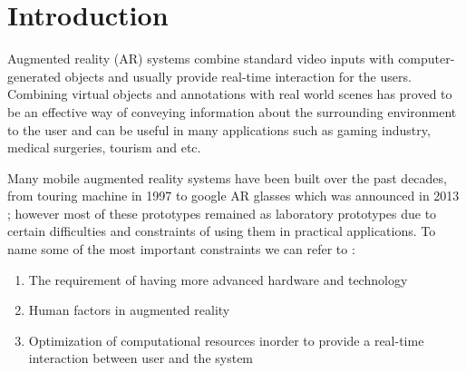 \documentclass[dvips,letterpaper,12pt]{report}
\begin{document}
\chapter{Introduction}

Augmented reality (AR) systems combine standard video inputs with computer-generated objects and
usually provide real-time interaction for the users. Combining virtual objects and annotations with real
world scenes has proved to be an effective way of conveying information about the surrounding environment to
the user and can be useful in many applications such as gaming industry, medical surgeries, tourism and etc.

Many mobile augmented reality systems have been built over the past decades, from touring machine in 1997 \cite{fei97} 
to google AR glasses which was announced in 2013 \cite{google}; however most of these prototypes remained as laboratory prototypes
due to certain difficulties and constraints of using them in practical applications. To name some of the most important constraints
we can refer to \cite{liv05}:
\begin{enumerate}
\item The requirement of having more advanced hardware and technology
\item Human factors in augmented reality 
\item Optimization of computational resources inorder to provide a real-time interaction between user and the system
\end{enumerate}
\end{document}
